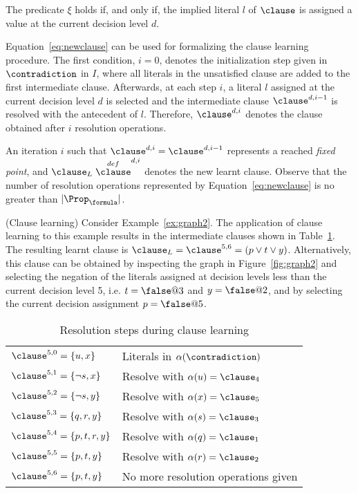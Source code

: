 The predicate $\xi$ holds if, and only if, the implied literal $l$ of $\clause$
is assigned a value at the current decision level $d$.   

Equation~\ref{eq:newclause} can be used for formalizing the clause learning
procedure. The first condition, $i = 0$, denotes the initialization step given
in $\contradiction$ in $I$, where all literals in the unsatisfied clause are added to
the first intermediate clause. Afterwards, at each step $i$, a literal $l$
assigned at the current decision level $d$ is selected and the intermediate
clause $\clause^{d, i-1}$ is resolved with the antecedent of $l$. Therefore,
$\clause^{d,i}$ denotes the clause obtained after $i$ resolution operations.

An iteration $i$ such that $\clause^{d, i} = \clause^{d, i-1}$ represents a
reached \emph{fixed point}, and $\clause_L \stackrel{def} \clause^{d, i}$
denotes the new learnt clause. Observe that the number of resolution
operations represented by Equation~\ref{eq:newclause} is no greater than
$|\Prop_\formula|$.

\begin{example}%
\label{ex:cl}
    (Clause learning)
    Consider Example~\ref{ex:graph2}. The application of clause learning to this
    example results in the intermediate clauses shown in Table~\ref{tab:cl}. The
    resulting learnt clause is $\clause_L = \clause^{5,6} = (p \lor t \lor y)$.
    Alternatively, this clause can be obtained by inspecting the graph in
    Figure~\ref{fig:graph2} and selecting the negation of the literals assigned
    at decision levels less than the current decision level 5, i.e. $t = \false
    @3$ and $y = \false @ 2$, and by selecting the current decision assignment
    $p = \false @5$.
\end{example}

\begin{table}%
\centering
\caption{Resolution steps during clause learning}
    \begin{tabular}{ll}
        \toprule
        $\clause^{5,0} = \{ u, x\}$ & Literals in $\alpha(\contradiction)$ \\
        $\clause^{5,1} = \{ \neg s, x\}$ & Resolve with $\alpha(u) = \clause_4$ \\
        $\clause^{5,2} = \{ \neg s, y\}$ & Resolve with $\alpha(x) = \clause_5$ \\
        $\clause^{5,3} = \{ q, r, y\}$ & Resolve with $\alpha(s) = \clause_3$ \\
        $\clause^{5,4} = \{ p, t, r, y\}$ & Resolve with $\alpha(q) = \clause_1$ \\
        $\clause^{5,5} = \{ p, t, y\}$ & Resolve with $\alpha(r) = \clause_2$ \\
        $\clause^{5,6} = \{ p, t, y\}$ & No more resolution operations given \\
        \toprule
    \end{tabular}%
\label{tab:cl}
\end{table}

